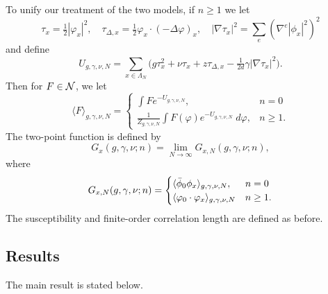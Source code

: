 To unify our treatment of the two models, if $n \ge 1$ we let
\begin{equation}
\tau_x = \tfrac{1}{2} |\varphi_x|^2,
  \quad
\tau_{\Delta,x} = \tfrac{1}{2} \varphi_x \cdot (-\Delta \varphi)_x,
  \quad
|\nabla\tau_x|^2 = \sum_e (\nabla^e |\phi_x|^2)^2
\end{equation}
and define
\begin{equation}
U_{g,\gamma,\nu,N}
	=
\sum_{x\in\Lambda_N}
\Big(
	g \tau_x^2 + \nu \tau_x + z \tau_{\Delta,x} - \tfrac{1}{2 d} \gamma |\nabla\tau_x|^2
\Big).
\end{equation}
Then for $F \in \mathcal{N}$, we let
\begin{equation}
\langle F \rangle_{g,\gamma,\nu,N}
	=
\begin{cases}
\int F e^{-U_{g,\gamma,\nu,N}},								& n = 0 \\
\frac{1}{Z_{g,\gamma,\nu,N}}
	\int F(\varphi) e^{-U_{g,\gamma,\nu,N}} \; d\varphi,	& n \ge 1.
\end{cases}
\end{equation}
The two-point function is defined by
\begin{equation}
G_x(g, \gamma, \nu; n) = \lim_{N\to\infty} G_{x,N}(g, \gamma, \nu; n),
\end{equation}
where
\begin{equation}
G_{x,N}(g, \gamma, \nu; n)
	=
\begin{cases}
\langle \bar\phi_0 \phi_x \rangle_{g,\gamma,\nu,N},			& n = 0 \\
\langle \varphi_0 \cdot \varphi_x \rangle_{g,\gamma,\nu,N}	& n \ge 1.
\end{cases}
\end{equation}
The susceptibility and finite-order correlation length are defined as before.


\subsection{Results}

The main result is stated below.

